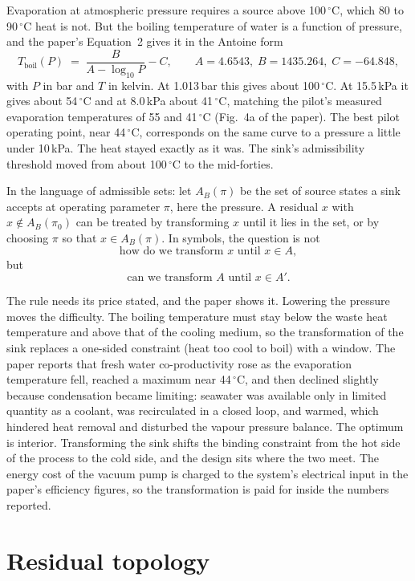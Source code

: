 \documentclass[11pt]{article}
\theoremstyle{definition}
\theoremstyle{remark}
\begin{document}
Evaporation at atmospheric pressure requires a source above 100\,$^{\circ}$C, which 80 to 90\,$^{\circ}$C heat is not. But the boiling temperature of water is a function of pressure, and the paper's Equation~2 gives it in the Antoine form
\begin{equation}
  T_{\mathrm{boil}}(P) \;=\; \frac{B}{A-\log_{10}P} - C, \qquad A=4.6543,\; B=1435.264,\; C=-64.848,
  \label{eq:antoine}
\end{equation}
with $P$ in bar and $T$ in kelvin. At 1.013\,bar this gives about 100\,$^{\circ}$C. At 15.5\,kPa it gives about 54\,$^{\circ}$C and at 8.0\,kPa about 41\,$^{\circ}$C, matching the pilot's measured evaporation temperatures of 55 and 41\,$^{\circ}$C (Fig.~4a of the paper). The best pilot operating point, near 44\,$^{\circ}$C, corresponds on the same curve to a pressure a little under 10\,kPa. The heat stayed exactly as it was. The sink's admissibility threshold moved from about 100\,$^{\circ}$C to the mid-forties.

In the language of admissible sets: let $A_B(\pi)$ be the set of source states a sink accepts at operating parameter $\pi$, here the pressure. A residual $x$ with $x\notin A_B(\pi_0)$ can be treated by transforming $x$ until it lies in the set, or by choosing $\pi$ so that $x\in A_B(\pi)$. In symbols, the question is not
\[
  \text{how do we transform } x \text{ until } x\in A,
\]
but
\[
  \text{can we transform } A \text{ until } x\in A'.
\]

The rule needs its price stated, and the paper shows it. Lowering the pressure moves the difficulty. The boiling temperature must stay below the waste heat temperature and above that of the cooling medium, so the transformation of the sink replaces a one-sided constraint (heat too cool to boil) with a window. The paper reports that fresh water co-productivity rose as the evaporation temperature fell, reached a maximum near 44\,$^{\circ}$C, and then declined slightly because condensation became limiting: seawater was available only in limited quantity as a coolant, was recirculated in a closed loop, and warmed, which hindered heat removal and disturbed the vapour pressure balance. The optimum is interior. Transforming the sink shifts the binding constraint from the hot side of the process to the cold side, and the design sits where the two meet. The energy cost of the vacuum pump is charged to the system's electrical input in the paper's efficiency figures, so the transformation is paid for inside the numbers reported.

\section{Residual topology}
\end{document}
